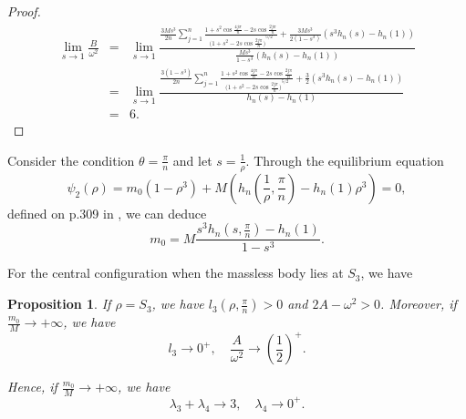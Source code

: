 \documentclass[11pt]{article}
\newtheorem{proposition}[lemma]{Proposition}
\def\lb{\label}
\begin{document}
\begin{proof}
\begin{eqnarray*}
       \lim_{s\to 1 }\frac{B}{\omega^2}&=& \lim_{s\to 1}
       \frac{
      \frac{3Ms^3}{2n}\sum_{j=1}^{n}
      \frac{
      1+s^2\cos{\frac{4j\pi}{n}}-2s\cos{\frac{2j\pi}{n}}
      }      {  (1+s^2-2s\cos{\frac{2j\pi}{n})} ^{5/2 } }
      +\frac{3Ms^3}{2(1-s^3)}(s^3h_n(s)-h_n(1))
      }
       {
       \frac{Ms^3}{1-s^3}(h_n(s)-h_n(1))
       }\\
       &=&\lim_{s\to 1}\frac{
       \frac{3(1-s^3)}{2n}\sum_{j=1}^{n}
      \frac{
      1+s^2\cos{\frac{4j\pi}{n}}-2s\cos{\frac{2j\pi}{n}}
      }      {  (1+s^2-2s\cos{\frac{2j\pi}{n})} ^{5/2 } }+\frac{3}{2}(s^3h_n(s)-h_n(1))
       }
       {h_n(s)-h_n(1)}\\
       &=&6.
   \end{eqnarray*}
\end{proof}

Consider the condition $\theta=\frac{\pi}{n}$ and let $s=\frac{1}{\rho}$. Through the  equilibrium equation 
    $$
    \psi_2(\rho)=m_0(1-\rho^3)+M\left(h_n\left(\frac{1}{\rho},\frac{\pi}{n}\right)-h_n(1)\rho^3\right)=0,
    $$
defined on p.309 in \cite{BaE}, we can deduce 
\begin{equation}\lb{S3}
m_0=M\frac{s^3h_n(s,\frac{\pi}{n})-h_n(1)}{1-s^3}.
\end{equation}

For the central configuration when the massless body lies at
 $S_3$, we have
\begin{proposition}\lb{A.3}
    If $\rho=S_3$,
    we have $l_3(\rho,\frac{\pi}{n})>0$ and $2A-\omega^2>0$.
    Moreover, if $\frac{m_0}{M}\to+\infty$, we have
    \begin{equation}
        l_3\to0^+,\quad \frac{A}{\omega^2}\to\left(\frac{1}{2}\right)^+.
    \end{equation}
    
    Hence, if $\frac{m_0}{M}\to+\infty$,
    we have
    \begin{equation}
        \lambda_3+\lambda_4\to3,\quad
        \lambda_4\to0^+.
    \end{equation}
\end{proposition}


\end{document}
